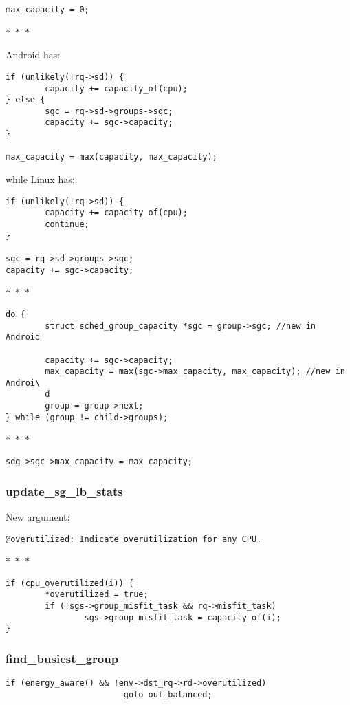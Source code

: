 \documentclass{article}
\newcommand{\divider}{{\begin{center}
  $\ast$~$\ast$~$\ast$
\end{center}}}
\begin{document}
\begin{verbatim}
max_capacity = 0;
\end{verbatim}
\divider
Android has:
\begin{verbatim}
if (unlikely(!rq->sd)) {
        capacity += capacity_of(cpu);
} else {
        sgc = rq->sd->groups->sgc;
        capacity += sgc->capacity;
}

max_capacity = max(capacity, max_capacity);
\end{verbatim}
while Linux has:
\begin{verbatim}
if (unlikely(!rq->sd)) {
        capacity += capacity_of(cpu);
        continue;
}

sgc = rq->sd->groups->sgc;
capacity += sgc->capacity;
\end{verbatim}
\divider
\begin{verbatim}
do {
        struct sched_group_capacity *sgc = group->sgc; //new in Android

        capacity += sgc->capacity;
        max_capacity = max(sgc->max_capacity, max_capacity); //new in Androi\
        d
        group = group->next;
} while (group != child->groups);
\end{verbatim}
\divider
\begin{verbatim}
sdg->sgc->max_capacity = max_capacity;
\end{verbatim}

\subsubsection{update\_sg\_lb\_stats}

New argument:
\begin{verbatim}
@overutilized: Indicate overutilization for any CPU.
\end{verbatim}
\divider
\begin{verbatim}
if (cpu_overutilized(i)) {
        *overutilized = true;
        if (!sgs->group_misfit_task && rq->misfit_task)
                sgs->group_misfit_task = capacity_of(i);
}
\end{verbatim}

\subsubsection{find\_busiest\_group}

\begin{verbatim}
if (energy_aware() && !env->dst_rq->rd->overutilized)
                        goto out_balanced;
\end{verbatim}
\end{document}
